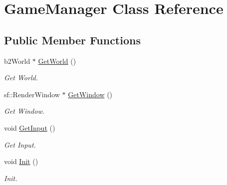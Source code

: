 \hypertarget{class_game_manager}{}\section{Game\+Manager Class Reference}
\label{class_game_manager}
\subsection*{Public Member Functions}
\begin{DoxyCompactItemize}
\item 
\mbox{\label{class_game_manager_a41d7c3afcf14f85e3716210e06b2ef20}} 
b2\+World $\ast$ \hyperlink{class_game_manager_a41d7c3afcf14f85e3716210e06b2ef20}{Get\+World} ()
\begin{DoxyCompactList}\small\item\em Get World. \end{DoxyCompactList}\item 
\mbox{\label{class_game_manager_a27a899cc5544c30719e8b57ae93d7ffc}} 
sf\+::\+Render\+Window $\ast$ \hyperlink{class_game_manager_a27a899cc5544c30719e8b57ae93d7ffc}{Get\+Window} ()
\begin{DoxyCompactList}\small\item\em Get Window. \end{DoxyCompactList}\item 
\mbox{\label{class_game_manager_ac227cf3926f59e4c2bf6420bfd1a90e6}} 
void \hyperlink{class_game_manager_ac227cf3926f59e4c2bf6420bfd1a90e6}{Get\+Input} ()
\begin{DoxyCompactList}\small\item\em Get Input. \end{DoxyCompactList}\item 
\mbox{\label{class_game_manager_ad27dc1c25f99244acafa5832bc2424a4}} 
void \hyperlink{class_game_manager_ad27dc1c25f99244acafa5832bc2424a4}{Init} ()
\begin{DoxyCompactList}\small\item\em Init. \end{DoxyCompactList}\item 
\mbox{\label{class_game_manager_a3aa49c2431d703ba1a5aa9183589e593}} 

\end{DoxyCompactItemize}
